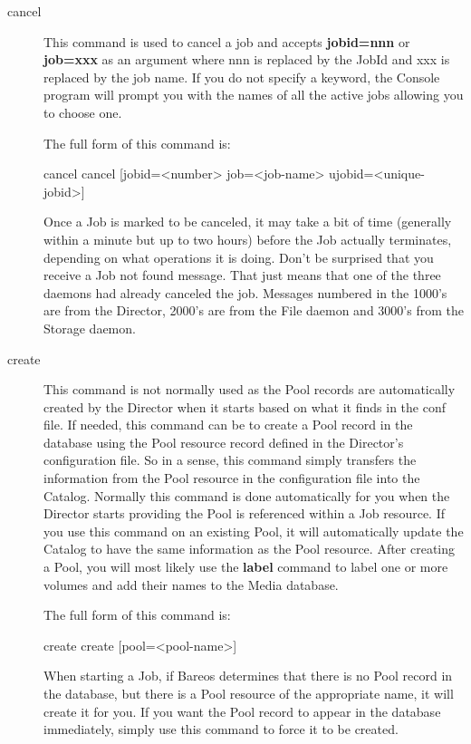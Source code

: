\begin{description}
\item [cancel]
   This command is used to cancel a job and accepts {\bf jobid=nnn} or {\bf
   job=xxx} as an argument where nnn is replaced by the JobId and xxx is
   replaced by the job name.  If you do not specify a keyword, the Console
   program will prompt you with the names of all the active jobs allowing
   you to choose one.

   The full form of this command is:

\begin{bconsole}{cancel}
cancel [jobid=<number> job=<job-name> ujobid=<unique-jobid>]
\end{bconsole}

   Once a Job is marked to be canceled, it may take a bit of time
   (generally within a minute but up to two hours) before the Job actually
   terminates, depending on what operations it is doing.
   Don't be surprised that you receive a Job not found message. That just
   means that one of the three daemons had already canceled the job.
   Messages numbered in the 1000's are from the Director, 2000's are from
   the File daemon and 3000's from the Storage daemon.

\item [create]
   This command is not normally used as the Pool records are automatically
   created by the Director when it starts based on what it finds in
   the conf file.  If needed, this command can be
   to create a Pool record in the database using the
   Pool resource record defined in the Director's configuration file.  So
   in a sense, this command simply transfers the information from the Pool
   resource in the configuration file into the Catalog.  Normally this
   command is done automatically for you when the Director starts providing
   the Pool is referenced within a Job resource.  If you use this command
   on an existing Pool, it will automatically update the Catalog to have
   the same information as the Pool resource.  After creating a Pool, you
   will most likely use the {\bf label} command to label one or more
   volumes and add their names to the Media database.

   The full form of this command is:

\begin{bconsole}{create}
create [pool=<pool-name>]
\end{bconsole}


   When starting a Job, if Bareos determines that there is no Pool record
   in the database, but there is a Pool resource of the appropriate name,
   it will create it for you.  If you want the Pool record to appear in the
   database immediately, simply use this command to force it to be created.


\end{description}
